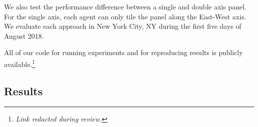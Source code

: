 \documentclass{article}
\begin{document}
{%

We also test the performance difference between a single and double axis panel. For the single axis, each agent can only tile the panel along the East-West axis. We evaluate each approach in New York City, NY during the first five days of August 2018.


All of our code for running experiments and for reproducing results is publicly available.\footnote{{\it Link redacted during review.}} %

\subsection{Results}


%


}
\end{document}
